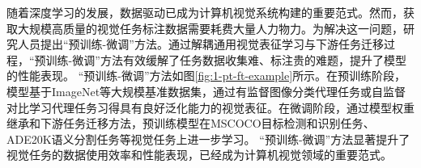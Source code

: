 随着深度学习的发展，数据驱动已成为计算机视觉系统构建的重要范式。然而，获取大规模高质量的视觉任务标注数据需要耗费大量人力物力。为解决这一问题，研究人员提出“预训练-微调”方法。通过解耦通用视觉表征学习与下游任务迁移过程，“预训练-微调”方法有效缓解了任务数据收集难、标注贵的难题，提升了模型的性能表现。
“预训练-微调”方法如图\ref{fig:1-pt-ft-example}所示。在预训练阶段，模型基于ImageNet\cite{deng2009imagenet}等大规模基准数据集，通过有监督图像分类代理任务\cite{alexnet}或自监督对比学习代理任务\cite{chen2020simple}习得具有良好泛化能力的视觉表征。在微调阶段，通过模型权重继承和下游任务迁移方法，预训练模型在MSCOCO目标检测和识别任务\cite{chen2015microsoft}、ADE20K语义分割任务\cite{zhou2019ade}等视觉任务上进一步学习。
“预训练-微调”方法显著提升了视觉任务的数据使用效率和性能表现，已经成为计算机视觉领域的重要范式。


